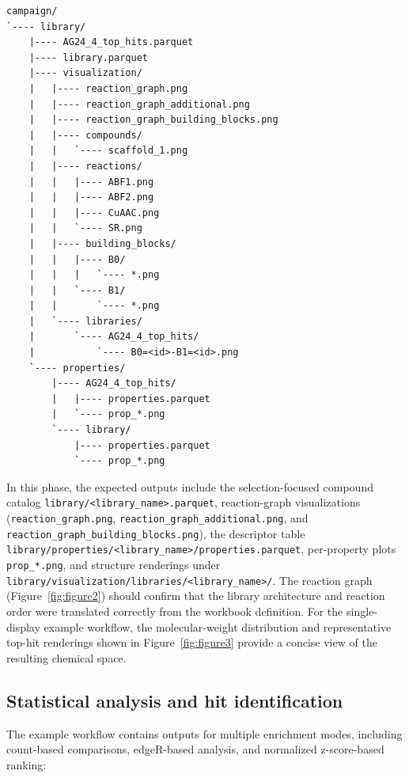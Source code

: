 \documentclass[pdflatex,sn-nature]{sn-jnl}
\begin{document}
\begin{lstlisting}
campaign/
`---- library/
    |---- AG24_4_top_hits.parquet
    |---- library.parquet
    |---- visualization/
    |   |---- reaction_graph.png
    |   |---- reaction_graph_additional.png
    |   |---- reaction_graph_building_blocks.png
    |   |---- compounds/
    |   |   `---- scaffold_1.png
    |   |---- reactions/
    |   |   |---- ABF1.png
    |   |   |---- ABF2.png
    |   |   |---- CuAAC.png
    |   |   `---- SR.png
    |   |---- building_blocks/
    |   |   |---- B0/
    |   |   |   `---- *.png
    |   |   `---- B1/
    |   |       `---- *.png
    |   `---- libraries/
    |       `---- AG24_4_top_hits/
    |           `---- B0=<id>-B1=<id>.png
    `---- properties/
        |---- AG24_4_top_hits/
        |   |---- properties.parquet
        |   `---- prop_*.png
        `---- library/
            |---- properties.parquet
            `---- prop_*.png
\end{lstlisting}

In this phase, the expected outputs include the selection-focused compound catalog \texttt{library/<library\_name>.parquet}, reaction-graph visualizations (\texttt{reaction\_graph.png}, \texttt{reaction\_graph\_additional.png}, and \texttt{reaction\_graph\_building\_blocks.png}), the descriptor table \texttt{library/properties/<library\_name>/properties.parquet}, per-property plots \texttt{prop\_*.png}, and structure renderings under \texttt{library/visualization/libraries/<library\_name>/}. The reaction graph (Figure~\ref{fig:figure2}) should confirm that the library architecture and reaction order were translated correctly from the workbook definition. For the single-display example workflow, the molecular-weight distribution and representative top-hit renderings shown in Figure~\ref{fig:figure3} provide a concise view of the resulting chemical space.

\subsection{Statistical analysis and hit identification}
The example workflow contains outputs for multiple enrichment modes, including count-based comparisons, edgeR-based analysis, and normalized z-score-based ranking:
\end{document}

